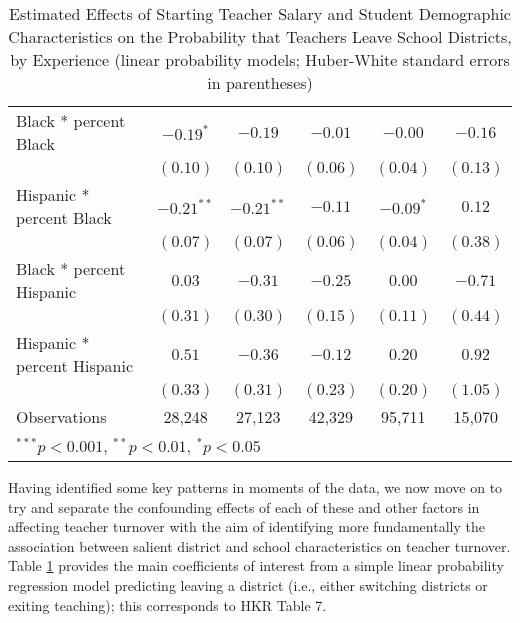 \documentclass[]{article}
\begin{document}
\begin{table}
\begin{center}
\begin{tabular}{l c c c c c }
\quad Black * percent Black                 & $-0.19^{*}$  & $-0.19$      & $-0.01$       & $-0.00$      & $-0.16$      \\
                                            & $(0.10)$     & $(0.10)$     & $(0.06)$      & $(0.04)$     & $(0.13)$     \\
\quad Hispanic * percent Black              & $-0.21^{**}$ & $-0.21^{**}$ & $-0.11$       & $-0.09^{*}$  & $0.12$       \\
                                            & $(0.07)$     & $(0.07)$     & $(0.06)$      & $(0.04)$     & $(0.38)$     \\
\quad Black * percent Hispanic              & $0.03$       & $-0.31$      & $-0.25$       & $0.00$       & $-0.71$      \\
                                            & $(0.31)$     & $(0.30)$     & $(0.15)$      & $(0.11)$     & $(0.44)$     \\
\quad Hispanic * percent Hispanic           & $0.51$       & $-0.36$      & $-0.12$       & $0.20$       & $0.92$       \\
                                            & $(0.33)$     & $(0.31)$     & $(0.23)$      & $(0.20)$     & $(1.05)$     \\
\hline
Observations                                & 28,248        & 27,123        & 42,329         & 95,711        & 15,070        \\
\hline
\multicolumn{6}{l}{\scriptsize{$^{***}p<0.001$, $^{**}p<0.01$, $^*p<0.05$}}
\end{tabular}
\caption{Estimated Effects of Starting Teacher Salary and Student Demographic Characteristics on the Probability that Teachers Leave School Districts, by Experience (linear probability models; Huber-White standard  errors in parentheses)}
\label{tbl:reg_lpm}
\end{center}
\end{table}

Having identified some key patterns in moments of the data, we now move
on to try and separate the confounding effects of each of these and
other factors in affecting teacher turnover with the aim of identifying
more fundamentally the association between salient district and school
characteristics on teacher turnover. Table \ref{tbl:reg_lpm} provides
the main coefficients of interest from a simple linear probability
regression model predicting leaving a district (i.e., either switching
districts or exiting teaching); this corresponds to HKR Table 7.
\end{document}

